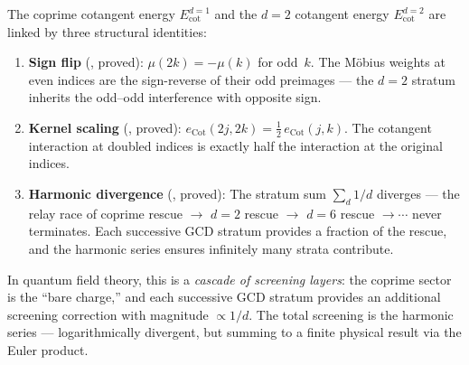 \begin{principle}
The coprime cotangent energy $E_{\mathrm{cot}}^{d=1}$ and the
$d=2$ cotangent energy $E_{\mathrm{cot}}^{d=2}$ are linked by
three structural identities:
\begin{enumerate}
  \item \textbf{Sign flip} (, proved):
    $\mu(2k) = -\mu(k)$ for odd~$k$.
    The M\"obius weights at even indices are the sign-reverse
    of their odd preimages --- the $d=2$ stratum inherits the
    odd--odd interference with opposite sign.
  \item \textbf{Kernel scaling} (, proved):
    $e_{\mathrm{Cot}}(2j, 2k) = \tfrac{1}{2}\, e_{\mathrm{Cot}}(j, k)$.
    The cotangent interaction at doubled indices is exactly half
    the interaction at the original indices.
  \item \textbf{Harmonic divergence} (, proved):
    The stratum sum $\sum_d 1/d$ diverges --- the relay race of
    coprime rescue $\to$ $d=2$ rescue $\to$ $d=6$ rescue $\to \cdots$
    never terminates. Each successive GCD stratum provides a
    fraction of the rescue, and the harmonic series ensures
    infinitely many strata contribute.
\end{enumerate}
In quantum field theory, this is a {\em cascade of screening layers}:
the coprime sector is the ``bare charge,'' and each successive GCD
stratum provides an additional screening correction with magnitude
$\propto 1/d$. The total screening is the harmonic series ---
logarithmically divergent, but summing to a finite physical result
via the Euler product.
\end{principle}

